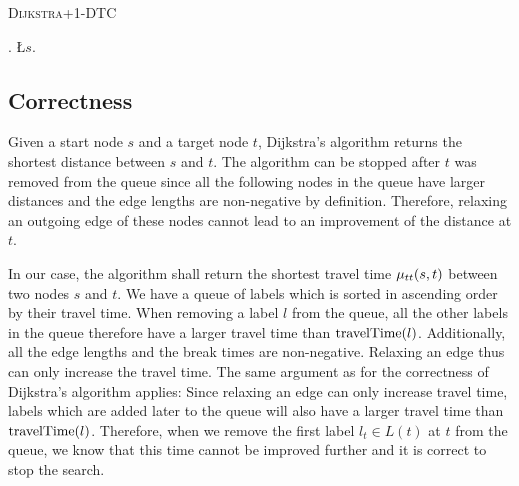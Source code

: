 \begin{algorithm}[htbt]
	\caption{\textsc{Dijkstra+1-DTC}}\label{alg:CSP}

	\DontPrintSemicolon %



	\BlankLine
	\Q.\;
	\L{$s$}.\;
	\BlankLine
	{
		\SettleNextLabel{}\;

		{
			\Return\;
		}
	}
\end{algorithm}

\subsection{Correctness\label{sec:dijkstra_csp_correctness}}
Given a start node $s$ and a target node $t$, Dijkstra's algorithm returns the shortest distance between $s$ and $t$. The algorithm can be stopped after $t$ was removed from the queue since all the following nodes in the queue have larger distances and the edge lengths are non-negative by definition. Therefore, relaxing an outgoing edge of these nodes cannot lead to an improvement of the distance at $t$.

In our case, the algorithm shall return the shortest travel time $\mu_{tt}(s,t)$ between two nodes $s$ and $t$. We have a queue of labels which is sorted in ascending order by their travel time. When removing a label $l$ from the queue, all the other labels in the queue therefore have a larger travel time than $\operatorname{travelTime}(l)$. Additionally, all the edge lengths and the break times are non-negative. Relaxing an edge thus can only increase the travel time. The same argument as for the correctness of Dijkstra's algorithm applies: Since relaxing an edge can only increase travel time, labels which are added later to the queue will also have a larger travel time than $\operatorname{travelTime}(l)$. Therefore, when we remove the first label $l_t \in L(t)$ at $t$ from the queue, we know that this time cannot be improved further and it is correct to stop the search.

